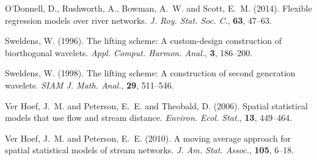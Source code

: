\documentclass[11pt,titlepage]{article}
\begin{document}
\begin{thebibliography}{}
O'Donnell, D., Rushworth, A., Bowman, A.~W. and Scott, E.~M. (2014). Flexible regression models over river networks. {\em J. Roy. Stat. Soc. C.}, {\bf 63}, 47--63.

Sweldens, W. (1996). The lifting scheme: A custom-design construction of biorthogonal wavelets. {\em Appl. Comput. Harmon. Anal.}, {\bf 3}, 186--200.

Sweldens, W. (1998). The lifting scheme: A construction of second generation wavelets. {\em SIAM J. Math. Anal.}, {\bf 29}, 511--546.

Ver Hoef, J.~M. and Peterson, E.~E. and Theobald, D. (2006). Spatial statistical models that use flow and stream distance. {\em Environ. Ecol. Stat.}, {\bf 13}, 449--464.

Ver Hoef, J.~M. and Peterson, E.~E. (2010). A moving average approach for spatial statistical models of stream networks. {\em J. Am. Stat. Assoc.}, {\bf 105}, 6--18.

\end{thebibliography}
\end{document}
